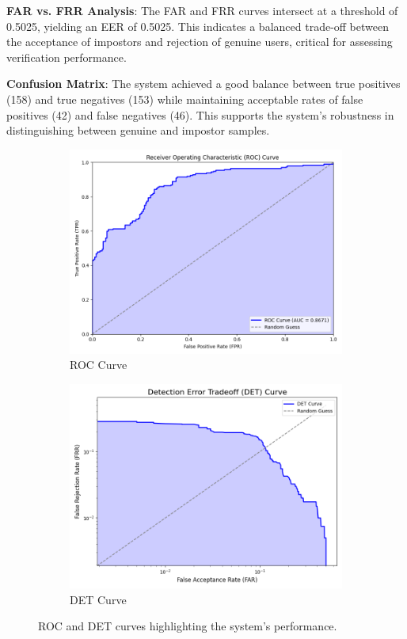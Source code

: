 \textbf{FAR vs. FRR Analysis}: The FAR and FRR curves intersect at a threshold of 0.5025, yielding an EER of 0.5025. This indicates a balanced trade-off between the acceptance of impostors and rejection of genuine users, critical for assessing verification performance.

\textbf{Confusion Matrix}: The system achieved a good balance between true positives (158) and true negatives (153) while maintaining acceptable rates of false positives (42) and false negatives (46). This supports the system's robustness in distinguishing between genuine and impostor samples.

\begin{figure}[!ht]
    \centering
    \begin{subfigure}[t]{0.48\columnwidth}
        \includegraphics[width=\textwidth]{./images/plots/ver/roc_curve.png}
        \caption{ROC Curve}
        \label{fig:roc_curve}
    \end{subfigure}
    \hfill
    \begin{subfigure}[t]{0.48\columnwidth}
        \includegraphics[width=\textwidth]{./images/plots/ver/det_curve.png}
        \caption{DET Curve}
        \label{fig:det_curve}
    \end{subfigure}
    \caption{ROC and DET curves highlighting the system's performance.}
    \label{fig:roc_det}
\end{figure}

